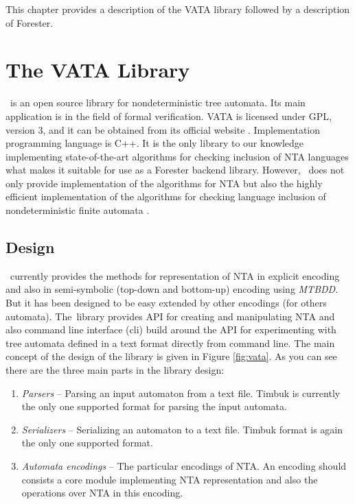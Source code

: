 This chapter provides a description of the VATA library followed by a description of Forester.

\section{The VATA Library}
\label{sec:VATA}

\Vata\ is an open source library for nondeterministic tree automata.
Its main application is in the field of formal verification.
VATA is licensed under GPL, version 3, and it can be obtained from its official website \cite{www:libvata}.
Implementation programming language is C++.
It is the only library to our knowledge implementing state-of-the-art algorithms for checking inclusion of NTA languages
what makes it suitable for use as a Forester backend library.
However, \vata\ does not only provide implementation of the algorithms for NTA
but also the highly efficient implementation of the algorithms for checking language inclusion of
nondeterministic finite automata \cite{bt:hruska}.

\subsection{Design}
\Vata\ currently provides the methods for representation of NTA
in explicit encoding and also in semi-symbolic (top-down and bottom-up)
encoding using \emph{MTBDD}.
But it has been designed to be easy extended by other encodings (for others automata).
The~library provides API for creating and manipulating NTA and also command line interface (cli) build around
the API for experimenting with tree automata defined in a text format directly from command line.
The main concept of the design of the library is given in Figure \ref{fig:vata}.
As you can see there are the three main parts in the library design:
\begin{enumerate}
	\item \emph{Parsers} -- Parsing an input automaton from a text file.
		Timbuk \cite{timbuk} is currently the only one supported format for parsing the input automata.
	\item \emph{Serializers} -- Serializing an automaton to a text file.
		Timbuk format is again the only one supported format.
	\item \emph{Automata encodings} -- The particular encodings of NTA.
		An encoding should consists a core module implementing NTA representation
		and also the operations over NTA in this encoding.
\end{enumerate}

